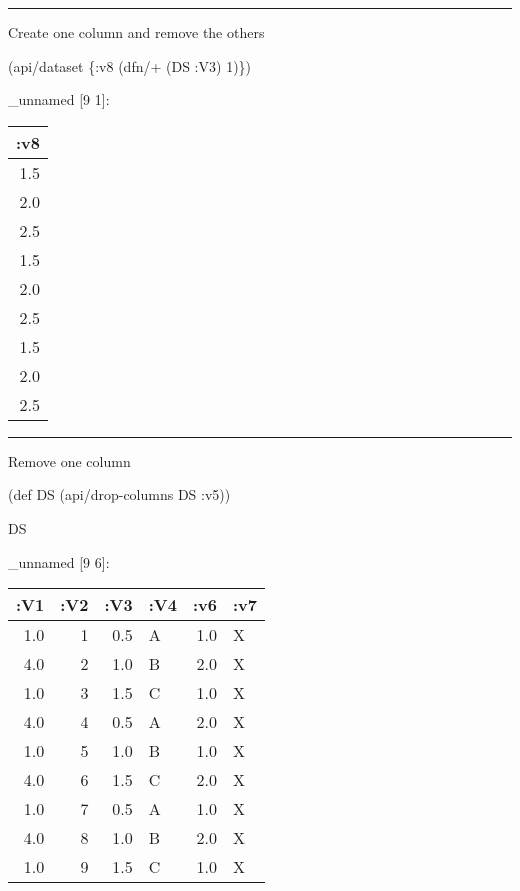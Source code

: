 \documentclass[]{article}
\newenvironment{Shaded}{\begin{snugshade}}{\end{snugshade}}
\newcommand{\DecValTok}[1]{\textcolor[rgb]{0.00,0.00,0.81}{#1}}
\newcommand{\FunctionTok}[1]{\textcolor[rgb]{0.00,0.00,0.00}{#1}}
\newcommand{\BuiltInTok}[1]{#1}
\newcommand{\AttributeTok}[1]{\textcolor[rgb]{0.77,0.63,0.00}{#1}}
\newcommand{\NormalTok}[1]{#1}
\begin{document}
\begin{center}\rule{0.5\linewidth}{0.5pt}\end{center}

Create one column and remove the others

\begin{Shaded}
\begin{Highlighting}[]
\NormalTok{(api/dataset \{}\AttributeTok{:v8}\NormalTok{ (dfn/+ (DS }\AttributeTok{:V3}\NormalTok{) }\DecValTok{1}\NormalTok{)\})}
\end{Highlighting}
\end{Shaded}

\_unnamed {[}9 1{]}:

\begin{longtable}[]{@{}r@{}}
\toprule
:v8\tabularnewline
\midrule
\endhead
1.5\tabularnewline
2.0\tabularnewline
2.5\tabularnewline
1.5\tabularnewline
2.0\tabularnewline
2.5\tabularnewline
1.5\tabularnewline
2.0\tabularnewline
2.5\tabularnewline
\bottomrule
\end{longtable}

\begin{center}\rule{0.5\linewidth}{0.5pt}\end{center}

Remove one column

\begin{Shaded}
\begin{Highlighting}[]
\NormalTok{(}\BuiltInTok{def}\FunctionTok{ DS }\NormalTok{(api/drop-columns DS }\AttributeTok{:v5}\NormalTok{))}
\end{Highlighting}
\end{Shaded}

\begin{Shaded}
\begin{Highlighting}[]
\NormalTok{DS}
\end{Highlighting}
\end{Shaded}

\_unnamed {[}9 6{]}:

\begin{longtable}[]{@{}rrrlrl@{}}
\toprule
:V1 & :V2 & :V3 & :V4 & :v6 & :v7\tabularnewline
\midrule
\endhead
1.0 & 1 & 0.5 & A & 1.0 & X\tabularnewline
4.0 & 2 & 1.0 & B & 2.0 & X\tabularnewline
1.0 & 3 & 1.5 & C & 1.0 & X\tabularnewline
4.0 & 4 & 0.5 & A & 2.0 & X\tabularnewline
1.0 & 5 & 1.0 & B & 1.0 & X\tabularnewline
4.0 & 6 & 1.5 & C & 2.0 & X\tabularnewline
1.0 & 7 & 0.5 & A & 1.0 & X\tabularnewline
4.0 & 8 & 1.0 & B & 2.0 & X\tabularnewline
1.0 & 9 & 1.5 & C & 1.0 & X\tabularnewline
\bottomrule
\end{longtable}
\end{document}
